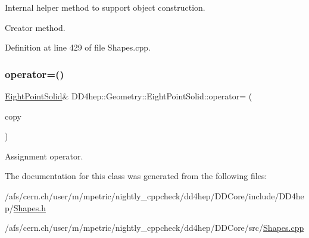 Internal helper method to support object construction. 

Creator method. 

Definition at line 429 of file Shapes.\+cpp.

\hypertarget{class_d_d4hep_1_1_geometry_1_1_eight_point_solid_af7ec0d88c449331fea5939435c22cedd}{}\label{class_d_d4hep_1_1_geometry_1_1_eight_point_solid_af7ec0d88c449331fea5939435c22cedd} 
\subsubsection{\texorpdfstring{operator=()}{operator=()}}
{\footnotesize\ttfamily \hyperlink{class_d_d4hep_1_1_geometry_1_1_eight_point_solid}{Eight\+Point\+Solid}\& D\+D4hep\+::\+Geometry\+::\+Eight\+Point\+Solid\+::operator= (\begin{DoxyParamCaption}\item[{const \hyperlink{class_d_d4hep_1_1_geometry_1_1_eight_point_solid}{Eight\+Point\+Solid} \&}]{copy }\end{DoxyParamCaption})\hspace{0.3cm}{\ttfamily [default]}}



Assignment operator. 



The documentation for this class was generated from the following files\+:\begin{DoxyCompactItemize}
\item 
/afs/cern.\+ch/user/m/mpetric/nightly\+\_\+cppcheck/dd4hep/\+D\+D\+Core/include/\+D\+D4hep/\hyperlink{_shapes_8h}{Shapes.\+h}\item 
/afs/cern.\+ch/user/m/mpetric/nightly\+\_\+cppcheck/dd4hep/\+D\+D\+Core/src/\hyperlink{_shapes_8cpp}{Shapes.\+cpp}\end{DoxyCompactItemize}
